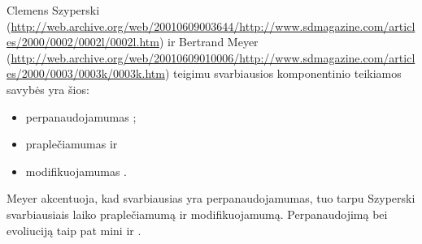 Clemens Szyperski
(\url{http://web.archive.org/web/20010609003644/http://www.sdmagazine.com/articles/2000/0002/0002l/0002l.htm})
ir Bertrand Meyer
(\url{http://web.archive.org/web/20010609010006/http://www.sdmagazine.com/articles/2000/0003/0003k/0003k.htm})
teigimu svarbiausios komponentinio teikiamos savybės yra šios:
\begin{itemize}
  \item perpanaudojamumas ;
  \item praplečiamumas  ir
  \item modifikuojamumas .
\end{itemize}
Meyer akcentuoja, kad svarbiausias yra perpanaudojamumas, tuo tarpu
Szyperski svarbiausiais laiko praplečiamumą ir modifikuojamumą.
Perpanaudojimą bei evoliuciją taip pat mini ir
\cite[28]{Hopkins:2000:CP:352183.352198}.
